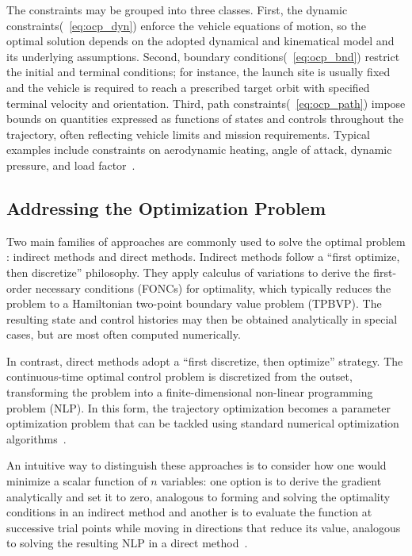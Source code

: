 The constraints may be grouped into three classes. First, the dynamic constraints(~\ref{eq:ocp_dyn}) enforce the vehicle equations of motion, so the optimal solution depends on the adopted dynamical and kinematical model and its underlying assumptions. Second, boundary conditions(~\ref{eq:ocp_bnd}) restrict the initial and terminal conditions; for instance, the launch site is usually fixed and the vehicle is required to reach a prescribed target orbit with specified terminal velocity and orientation. Third, path constraints(~\ref{eq:ocp_path}) impose bounds on quantities expressed as functions of states and controls throughout the trajectory, often reflecting vehicle limits and mission requirements. Typical examples include constraints on aerodynamic heating, angle of attack, dynamic pressure, and load factor~\cite{Cremaschi2013TrajectoryOptimization}.


\subsection{Addressing the Optimization Problem}

Two main families of approaches are commonly used to solve the optimal problem \cite{Optimization_Review}: indirect methods and direct methods. Indirect methods follow a ``first optimize, then discretize'' philosophy. They apply calculus of variations to derive the first-order necessary conditions (FONCs) for optimality, which typically reduces the problem to a Hamiltonian two-point boundary value problem (TPBVP). The resulting state and control histories may then be obtained analytically in special cases, but are most often computed numerically.

In contrast, direct methods adopt a ``first discretize, then optimize'' strategy. The continuous-time optimal control problem is discretized from the outset, transforming the problem into a finite-dimensional non-linear programming problem (NLP). In this form, the trajectory optimization becomes a parameter optimization problem that can be tackled using standard numerical optimization algorithms~\cite{Optimization_Review}.

An intuitive way to distinguish these approaches is to consider how one would minimize a scalar function of $n$ variables: one option is to derive the gradient analytically and set it to zero, analogous to forming and solving the optimality conditions in an indirect method and another is to evaluate the function at successive trial points while moving in directions that reduce its value, analogous to solving the resulting NLP in a direct method~\cite{Optimization_Review}.

